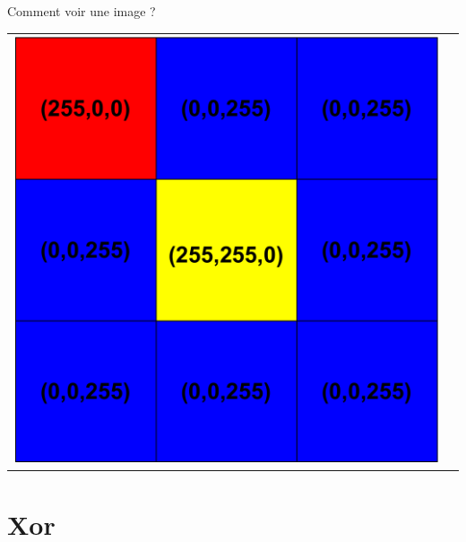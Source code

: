 \documentclass{beamer}
\begin{document}
\begin{frame}{Comment voir une image ?}
\begin{center}
\begin{tabular}{cp{200pt}}
                \vspace{12pt}
                
                \includegraphics[scale=.17]{pics/pixels_zoom.png}
            \end{tabular}
        \end{center}
    \end{frame}%
    
    \section{Xor}
\end{document}
